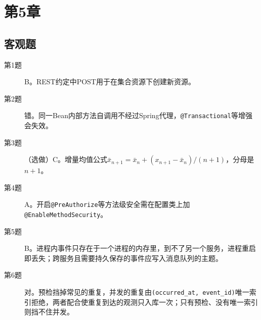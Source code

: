 \section{第5章}

\subsection*{客观题}
\begin{description}
  \item[第1题] B。REST约定中POST用于在集合资源下创建新资源。
  \item[第2题] 错。同一Bean内部方法自调用不经过Spring代理，\texttt{@Transactional}等增强会失效。
  \item[第3题]（选做）C。增量均值公式$\bar{x}_{n+1}=\bar{x}_n+(x_{n+1}-\bar{x}_n)/(n+1)$，分母是$n+1$。
  \item[第4题] A。开启\texttt{@PreAuthorize}等方法级安全需在配置类上加\texttt{@EnableMethodSecurity}。
  \item[第5题] B。进程内事件只存在于一个进程的内存里，到不了另一个服务，进程重启即丢失；跨服务且需要持久保存的事件应写入消息队列的主题。
  \item[第6题] 对。预检挡掉常见的重复，并发的重复由\texttt{(occurred\_at, event\_id)}唯一索引拒绝，两者配合使重复到达的观测只入库一次；只有预检、没有唯一索引则挡不住并发。
\end{description}


